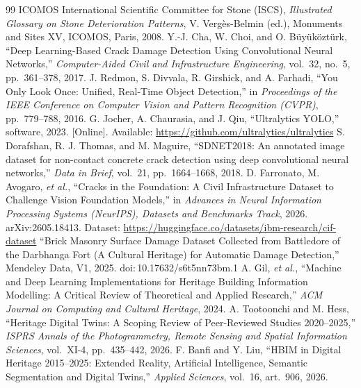 \documentclass[a4paper,12pt,oneside]{book}
\begin{document}
\fontsize{12pt}{12pt}\selectfont

\renewcommand\bibname{BIBILOGRAPHY}
\clearpage
{}
{}
\begin{thebibliography}{99}
 ICOMOS International Scientific Committee for Stone (ISCS), \emph{Illustrated Glossary on Stone Deterioration Patterns}, V. Verg\`es-Belmin (ed.), Monuments and Sites XV, ICOMOS, Paris, 2008.
 Y.-J. Cha, W. Choi, and O. B\"uy\"uk\"ozt\"urk, ``Deep Learning-Based Crack Damage Detection Using Convolutional Neural Networks,'' \emph{Computer-Aided Civil and Infrastructure Engineering}, vol.~32, no.~5, pp.~361--378, 2017.
 J. Redmon, S. Divvala, R. Girshick, and A. Farhadi, ``You Only Look Once: Unified, Real-Time Object Detection,'' in \emph{Proceedings of the IEEE Conference on Computer Vision and Pattern Recognition (CVPR)}, pp.~779--788, 2016.
 G. Jocher, A. Chaurasia, and J. Qiu, ``Ultralytics YOLO,'' software, 2023. [Online]. Available: \url{https://github.com/ultralytics/ultralytics}
 S. Dorafshan, R. J. Thomas, and M. Maguire, ``SDNET2018: An annotated image dataset for non-contact concrete crack detection using deep convolutional neural networks,'' \emph{Data in Brief}, vol.~21, pp.~1664--1668, 2018.
 D. Farronato, M. Avogaro, \emph{et al.}, ``Cracks in the Foundation: A Civil Infrastructure Dataset to Challenge Vision Foundation Models,'' in \emph{Advances in Neural Information Processing Systems (NeurIPS), Datasets and Benchmarks Track}, 2026. arXiv:2605.18413. Dataset: \url{https://huggingface.co/datasets/ibm-research/cif-dataset}
 ``Brick Masonry Surface Damage Dataset Collected from Battledore of the Darbhanga Fort (A Cultural Heritage) for Automatic Damage Detection,'' Mendeley Data, V1, 2025. doi:\,10.17632/s6t5nn73bm.1
 A. Gil, \emph{et al.}, ``Machine and Deep Learning Implementations for Heritage Building Information Modelling: A Critical Review of Theoretical and Applied Research,'' \emph{ACM Journal on Computing and Cultural Heritage}, 2024.
 A. Tootoonchi and M. Hess, ``Heritage Digital Twins: A Scoping Review of Peer-Reviewed Studies 2020--2025,'' \emph{ISPRS Annals of the Photogrammetry, Remote Sensing and Spatial Information Sciences}, vol.~XI-4, pp.~435--442, 2026.
 F. Banfi and Y. Liu, ``HBIM in Digital Heritage 2015--2025: Extended Reality, Artificial Intelligence, Semantic Segmentation and Digital Twins,'' \emph{Applied Sciences}, vol.~16, art.~906, 2026.

\end{thebibliography}
\end{document}
